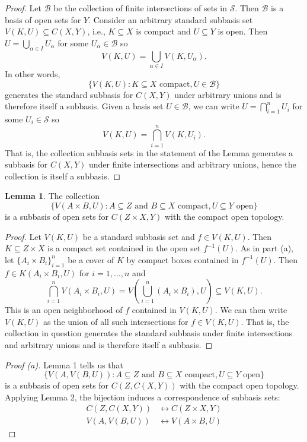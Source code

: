 \documentclass[12pt]{article}
\theoremstyle{definition}
\newtheorem{lemma}{Lemma}
\newcommand{\<}{\langle}
\renewcommand{\>}{\rangle}
\renewcommand{\SS}{\mathcal{S}}
\begin{document}
\begin{proof}
    Let $\mathcal{B}$ be the collection of finite intersections of sets in $\SS$.
    Then $\mathcal{B}$ is a basis of open sets for $Y$.
    Consider an arbitrary standard subbasis set $V(K, U) \subseteq C(X, Y)$, i.e., $K \subseteq X$ is compact and $U \subseteq Y$ is open.
    Then $U = \bigcup_{\alpha \in I} U_\alpha$ for some $U_\alpha \in \mathcal{B}$ so
    \[\textstyle
        V(K, U) = \bigcup\limits_{\alpha \in I} V(K, U_\alpha).
    \]
    In other words,
    \[
        \{V(K, U) : K \subseteq X \text{ compact}, U \in \mathcal{B}\}
    \]
    generates the standard subbasis for $C(X, Y)$ under arbitrary unions and is therefore itself a subbasis.
    Given a basis set $U \in \mathcal{B}$, we can write $U = \bigcap_{i=1}^{n} U_i$ for some $U_i \in \SS$ so
    \[\textstyle
        V(K, U) = \bigcap_{i=1}^{n} V(K, U_i).
    \]
    That is, the collection subbasis sets in the statement of the Lemma generates a subbasis for $C(X, Y)$ under finite intersections and arbitrary unions, hence the collection is itself a subbasis.
\end{proof}


\begin{lemma}
    The collection
    \[
        \{V(A \times B, U) : A \subseteq Z \text{ and } B \subseteq X \text{ compact}, U \subseteq Y \text{ open}\}
    \]
    is a subbasis of open sets for $C(Z \times X, Y)$ with the compact open topology.
\end{lemma}


\begin{proof}
    Let $V(K, U)$ be a standard subbasis set and $f \in V(K, U)$.
    Then $K \subseteq Z \times X$ is a compact set contained in the open set $f^{-1}(U)$.
    As in part (a), let $\{A_i \times B_i\}_{i=1}^{n}$ be a cover of $K$ by compact boxes contained in $f^{-1}(U)$.
    Then $f \in K(A_i \times B_i, U)$ for $i = 1, \dots, n$ and
    \[
        \bigcap_{i=1}^{n} V(A_i \times B_i, U)
            = V({\textstyle\bigcup\limits_{i=1}^{n}} (A_i \times B_i), U)
            \subseteq V(K, U).
    \]
    This is an open neighborhood of $f$ contained in $V(K, U)$.
    We can then write $V(K, U)$ as the union of all such intersections for $f \in V(K, U)$.
    That is, the collection in question generates the standard subbasis under finite intersections and arbitrary unions and is therefore itself a subbasis.
\end{proof}


\begin{proof}[Proof (a)]
    Lemma 1 tells us that
    \[
        \{V(A, V(B, U)) : A \subseteq Z \text{ and } B \subseteq X \text{ compact}, U \subseteq Y \text{ open}\}
    \]
    is a subbasis of open sets for $C(Z, C(X, Y))$ with the compact open topology.
    Applying Lemma 2, the bijection induces a correspondence of subbasis sets:
    \begin{align*}
        C(Z, C(X, Y)) &\longleftrightarrow C(Z \times X, Y) \\
        V(A, V(B, U)) &\longleftrightarrow V(A \times B, U)
    \end{align*}
\end{proof}
\end{document}
